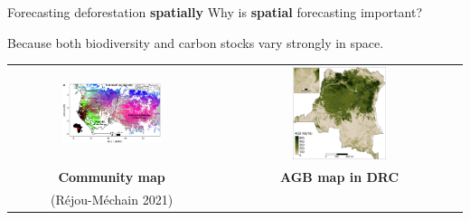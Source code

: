 \documentclass[10pt,table,dvipsnames,compress]{beamer}
\begin{document}
\begin{frame}[label={sec:org41602ef}]{Forecasting deforestation \textbf{spatially}}
Why is \textbf{spatial} forecasting important?

Because both biodiversity and carbon stocks vary strongly in space.

\vspace{0.25cm}

\begin{tabular}{cc}
\includegraphics[width=0.5\textwidth]{figs/Rejou2021-Floristic} & \includegraphics[width=0.40\textwidth]{figs/sm/AGB}\\
\textbf{Community map} & \textbf{AGB map in DRC} \\
(Réjou-Méchain 2021) & ~
\end{tabular}
\end{frame}
\end{document}
